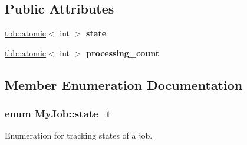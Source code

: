 \subsection*{Public Attributes}
\begin{DoxyCompactItemize}
\item 
\hypertarget{classMyJob_a7f5a8cef9effe4013aba12e9d1175731}{}\hyperlink{structtbb_1_1atomic}{tbb\+::atomic}$<$ int $>$ {\bfseries state}\label{classMyJob_a7f5a8cef9effe4013aba12e9d1175731}

\item 
\hypertarget{classMyJob_a48724c12e5bc721555f850e749ba7b53}{}\hyperlink{structtbb_1_1atomic}{tbb\+::atomic}$<$ int $>$ {\bfseries processing\+\_\+count}\label{classMyJob_a48724c12e5bc721555f850e749ba7b53}

\end{DoxyCompactItemize}


\subsection{Member Enumeration Documentation}
\hypertarget{classMyJob_a44f37d865cfb3f176ea9c11a1e8e8990}{}
\subsubsection[{state\+\_\+t}]{\setlength{\rightskip}{0pt plus 5cm}enum {\bf My\+Job\+::state\+\_\+t}}\label{classMyJob_a44f37d865cfb3f176ea9c11a1e8e8990}


Enumeration for tracking states of a job. 

